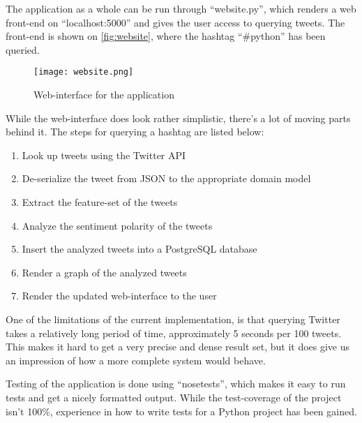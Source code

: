 \documentclass[Main]{subfiles}
\begin{document}
The application as a whole can be run through ``website.py'', 
which renders a web front-end on ``localhost:5000'' and gives the user access to querying tweets.
The front-end is shown on \autoref{fig:website}, where the hashtag ``\#python'' has been queried.

\begin{figure}[h]
  \centering
  \texttt{[image: website.png]}
  \caption{Web-interface for the application}
  \label{fig:website}
\end{figure}

While the web-interface does look rather simplistic, there's a lot of moving parts behind it.
The steps for querying a hashtag are listed below:
\begin{enumerate}
\item Look up tweets using the Twitter API
\item De-serialize the tweet from JSON to the appropriate domain model
\item Extract the feature-set of the tweets
\item Analyze the sentiment polarity of the tweets
\item Insert the analyzed tweets into a PostgreSQL database
\item Render a graph of the analyzed tweets
\item Render the updated web-interface to the user
\end{enumerate}

One of the limitations of the current implementation, is that querying Twitter takes a relatively long period of time,
approximately 5 seconds per 100 tweets.
This makes it hard to get a very precise and dense result set, but it does give us an impression of how a more complete system would behave.

Testing of the application is done using ``nosetests'', which makes it easy to run tests and get a nicely formatted output.
While the test-coverage of the project isn't 100\%, experience in how to write tests for a Python project has been gained.
\end{document}
